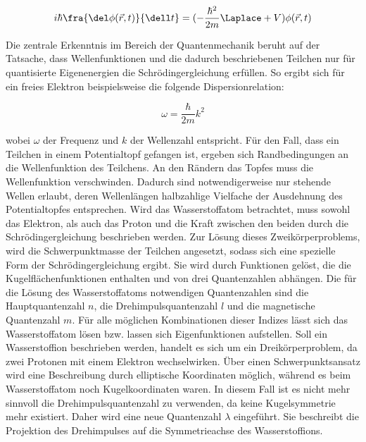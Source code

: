 \begin{equation}
    i \hbar \fra{\del \phi(\vec{r},t)}{\dell t} = ( - \frac{\hbar^2}{2m} \Laplace + V) \phi(\vec{r},t)
    \label{schroed}
\end{equation}

Die zentrale Erkenntnis im Bereich der Quantenmechanik beruht 
auf  der Tatsache, dass Wellenfunktionen und die dadurch beschriebenen Teilchen nur für 
quantisierte Eigenenergien die Schrödingergleichung erfüllen.
So ergibt sich für ein freies Elektron beispielsweise die folgende Dispersionrelation:

\begin{equation}
    \omega = \frac{\hbar}{2m}k^2
    \label{dispel}
\end{equation}

wobei $\omega$ der Frequenz und $k$ der Wellenzahl entspricht.
Für den Fall, dass ein Teilchen in einem Potentialtopf gefangen ist, ergeben sich
Randbedingungen an die Wellenfunktion des Teilchens. An den Rändern das Topfes muss die 
Wellenfunktion verschwinden. Dadurch sind notwendigerweise nur stehende Wellen erlaubt, 
deren Wellenlängen halbzahlige Vielfache der Ausdehnung des Potentialtopfes entsprechen.
Wird das Wasserstoffatom betrachtet, muss sowohl das Elektron, als auch das Proton 
und die Kraft zwischen den beiden durch die Schrödingergleichung beschrieben werden.
Zur Lösung dieses Zweikörperproblems, wird die Schwerpunktmasse der Teilchen angesetzt, 
sodass sich eine spezielle Form der Schrödingergleichung ergibt. Sie wird durch Funktionen 
gelöst, die die Kugelflächenfunktionen enthalten und von drei Quantenzahlen abhängen.
Die für die Lösung des Wasserstoffatoms notwendigen Quantenzahlen sind die Hauptquantenzahl $n$,
die Drehimpulsquantenzahl $l$ und die magnetische Quantenzahl $m$. Für alle möglichen Kombinationen dieser
Indizes lässt sich das Wasserstoffatom lösen bzw. lassen sich Eigenfunktionen aufstellen.
Soll ein Wasserstoffion beschrieben werden, handelt es sich um ein Dreikörperproblem,
da zwei Protonen mit einem Elektron wechselwirken. Über einen Schwerpunktsansatz wird
eine Beschreibung durch elliptische Koordinaten möglich, während es beim Wasserstoffatom noch 
Kugelkoordinaten waren. In diesem Fall ist es nicht mehr sinnvoll die 
Drehimpulsquantenzahl zu verwenden, da keine Kugelsymmetrie mehr existiert.
Daher wird eine neue Quantenzahl $\lambda$ eingeführt. Sie beschreibt die Projektion 
des Drehimpulses auf die Symmetrieachse des Wasserstoffions.

